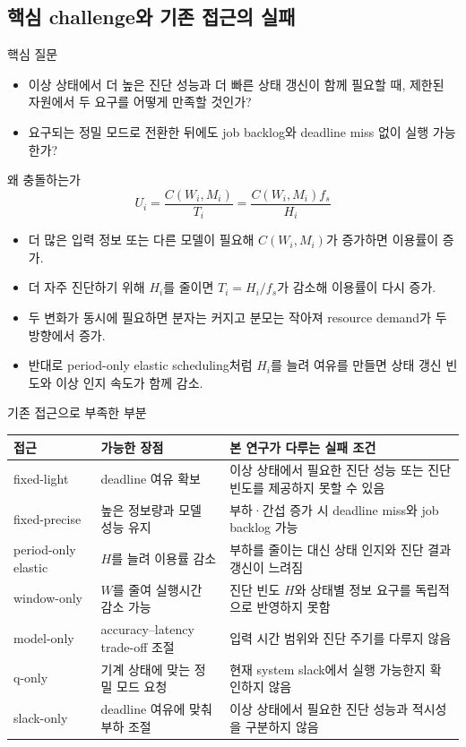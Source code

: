 \documentclass[10pt]{article}
\begin{document}
\subsection{핵심 challenge와 기존 접근의 실패}
\noindent 핵심 질문
\begin{itemize}
\item 이상 상태에서 더 높은 진단 성능과 더 빠른 상태 갱신이 함께 필요할 때, 제한된 자원에서 두 요구를 어떻게 만족할 것인가?
\item 요구되는 정밀 모드로 전환한 뒤에도 job backlog와 deadline miss 없이 실행 가능한가?
\end{itemize}
\noindent 왜 충돌하는가
\begin{equation*}
U_i=\frac{C(W_i,M_i)}{T_i}=\frac{C(W_i,M_i)f_s}{H_i}
\end{equation*}
\begin{itemize}
\item 더 많은 입력 정보 또는 다른 모델이 필요해 $C(W_i,M_i)$가 증가하면 이용률이 증가.
\item 더 자주 진단하기 위해 $H_i$를 줄이면 $T_i=H_i/f_s$가 감소해 이용률이 다시 증가.
\item 두 변화가 동시에 필요하면 분자는 커지고 분모는 작아져 resource demand가 두 방향에서 증가.
\item 반대로 period-only elastic scheduling처럼 $H_i$를 늘려 여유를 만들면 상태 갱신 빈도와 이상 인지 속도가 함께 감소.
\end{itemize}
\noindent 기존 접근으로 부족한 부분
\begin{center}\footnotesize
\begin{tabular}{@{}L{2.4cm}L{4.5cm}L{7.1cm}@{}}
\toprule
접근 & 가능한 장점 & 본 연구가 다루는 실패 조건 \\ \midrule
fixed-light & deadline 여유 확보 & 이상 상태에서 필요한 진단 성능 또는 진단 빈도를 제공하지 못할 수 있음 \\
fixed-precise & 높은 정보량과 모델 성능 유지 & 부하·간섭 증가 시 deadline miss와 job backlog 가능 \\
period-only elastic & $H$를 늘려 이용률 감소 & 부하를 줄이는 대신 상태 인지와 진단 결과 갱신이 느려짐 \\
window-only & $W$를 줄여 실행시간 감소 가능 & 진단 빈도 $H$와 상태별 정보 요구를 독립적으로 반영하지 못함 \\
model-only & accuracy--latency trade-off 조절 & 입력 시간 범위와 진단 주기를 다루지 않음 \\
q-only & 기계 상태에 맞는 정밀 모드 요청 & 현재 system slack에서 실행 가능한지 확인하지 않음 \\
slack-only & deadline 여유에 맞춰 부하 조절 & 이상 상태에서 필요한 진단 성능과 적시성을 구분하지 않음 \\
\bottomrule
\end{tabular}
\end{center}
\end{document}
